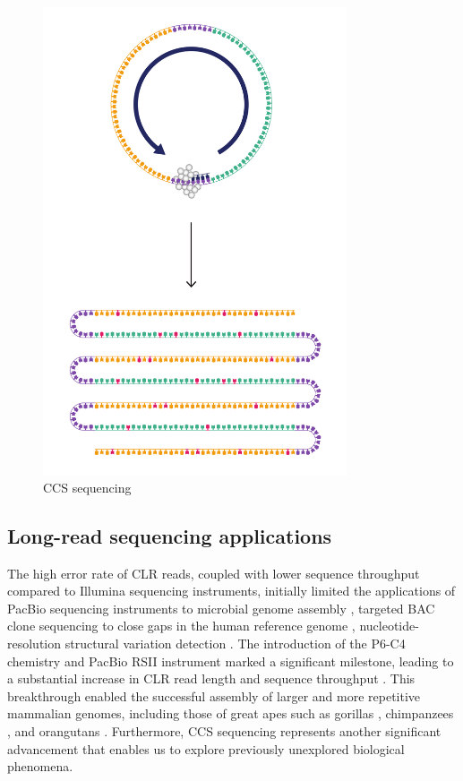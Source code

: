 \begin{figure}[htbp!]
\caption{CCS sequencing}
\label{figure:ccs-sequencing}
\begin{centering}
\includegraphics[width=0.8\textwidth]{Vector/CCS_sequencing.pdf}
\end{centering}
\end{figure}

\subsection{Long-read sequencing applications}

The high error rate of CLR reads, coupled with lower sequence throughput compared to Illumina sequencing instruments, initially limited the applications of PacBio sequencing instruments to microbial genome assembly \cite{Chin2013-hp}, targeted BAC clone sequencing to close gaps in the human reference genome \cite{Huddleston2014-rs}, nucleotide-resolution structural variation detection \cite{}. The introduction of the P6-C4 chemistry and PacBio RSII instrument marked a significant milestone, leading to a substantial increase in CLR read length and sequence throughput \cite{Rhoads2015-pk}. This breakthrough enabled the successful assembly of larger and more repetitive mammalian genomes, including those of great apes such as gorillas \cite{Gordon2016-ho}, chimpanzees \cite{Kronenberg2018-wy}, and orangutans \cite{Kronenberg2018-wy}. Furthermore, CCS sequencing represents another significant advancement that enables us to explore previously unexplored biological phenomena.

